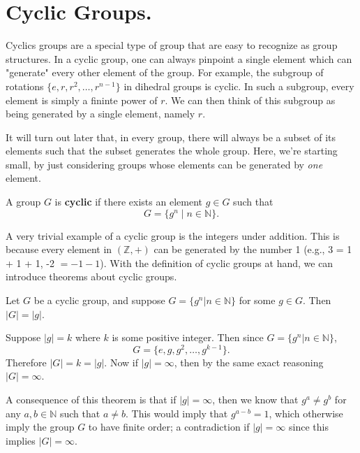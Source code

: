     \newpage
    \section{Cyclic Groups.}
    Cyclics groups are a special type of group that are easy to
    recognize as group structures. In a cyclic group, one can always
    pinpoint a single element which can "generate" every other element
    of the group. For example, the subgroup of rotations $\{e, r, r^2,
    \dots, r^{n-1}\}$ in dihedral groups
    is cyclic. In such a subgroup, every element is simply a fininte
    power of $r$. We can then think of this subgroup as
    being generated by a single element, namely $r$.

    It will turn out later that, in every group, there will always be
    a subset of its elements such that the subset generates the whole
    group. Here, we're starting small, by just considering groups
    whose elements can be generated by \textit{one} element.

    \begin{definition}
        A group $G$ is \textbf{cyclic} if there exists an element $g
        \in G$ such that 
        \[
            G = \{g^n \mid n \in \mathbb{N}\}.
        \]
    \end{definition}
    
    A very trivial example of a cyclic group is the integers under
    addition. This is because every element in $(\mathbb{Z}, +)$ can
    be generated by the number 1 (e.g., 3 = 1 + 1 + 1, -2 $= -1 -1$).
    With the definition of cyclic groups at hand, we can introduce
    theorems about cyclic groups.

    \begin{thm}
        Let $G$ be a cyclic group, and suppose $G = \{g^n 
        | n \in \mathbb{N}\}$ for some $g \in G$. Then $|G| = |g|$.
    \end{thm}

    \begin{prf}
        Suppose $|g| = k$ where $k$ is some positive integer. Then 
        since $G = \{g^n | n \in \mathbb{N}\}$, 
        \[
            G = \{e, g, g^2, \dots, g^{k-1}\}.
        \]
        Therefore $|G| = k = |g|$. Now if $|g| = \infty$, then 
        by the same exact reasoning $|G| = \infty$.
    \end{prf}
    A consequence of this theorem is that if $|g| = \infty$, then we
    know that $g^a \ne g^b$ for any $a, b \in \mathbb{N}$ such that $a
    \ne b$. This would imply that $g^{a - b} = 1$, which otherwise 
    imply the group $G$ to have finite order; a contradiction if $|g|
    = \infty$ since this implies $|G| = \infty$.

